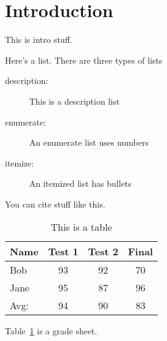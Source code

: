 \section{Introduction}

This is intro stuff.

Here's a list.  There are three types of lists
\begin{description}

\item[description:]  This is a description list
\item[enumerate:]  An enumerate list uses numbers
\item[itemize:]  An itemized list has bullets
\end{description}

You can cite stuff like this\cite{ref99}.

\begin{table}[htbp]
\begin{center}
\caption{\label{tab:mytable}This is a table}
\begin{tabular}{|l||c|c|c|} \hline
Name & Test 1 & Test 2 & Final \\ \hline \hline
Bob & 93 & 92 & 70 \\ \hline
Jane & 95 & 87 & 96 \\ \hline \hline
Avg: & 94 & 90 & 83 \\ \hline
\end{tabular}
\end{center}
\end{table}

Table~\ref{tab:mytable} is a grade sheet.

